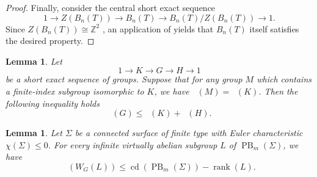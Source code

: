 \documentclass[a4paper,12pt,leqno]{amsart}
\newtheorem{lemma}[theorem]{Lemma}
\theoremstyle{definition}
\newcommand{\calF}{{\mathcal F}}
\DeclareMathOperator{\cd}{cd}
\DeclareMathOperator{\gdfin}{gd_{\calF_0}}
\DeclareMathOperator{\pb}{PB}
\DeclareMathOperator{\rank}{rank}
\begin{document}
\begin{proof}
Finally, consider the central short exact sequence
\[
  1 \to Z(B_n(T)) \to B_n(T) \to B_n(T)/Z(B_n(T)) \to 1.
\]
Since $Z(B_n(T)) \cong \mathbb{Z}^2$ \cite[Proposition 4.2]{Paris:Rolfsen}, an application of \cite[Proposition 4.15]{Rita:Porfirio:Luis}
yields that $B_n(T)$ itself satisfies the desired property.

\end{proof}




\begin{lemma}\label{exten:gd:inequality}\cite[Theorem 5.16]{Lu05}
Let 
\[
1 \to K \to G \to H \to 1
\]
be a short exact sequence of groups. Suppose that for any group \( M \) which contains a finite-index subgroup isomorphic to \( K \), we have \( \gdfin(M) = \gdfin(K) \). Then the following inequality holds
\[
\gdfin(G) \leq \gdfin(K) + \gdfin(H).
\]
\end{lemma}


\begin{lemma}\label{upper:bound:weil}
Let \( \Sigma \) be a connected surface of finite type with Euler characteristic \( \chi(\Sigma) \leq 0 \). For every infinite virtually abelian subgroup \( L \) of \( \pb_{m}(\Sigma) \), we have 
\[
\gdfin(W_G(L)) \leq \cd(\pb_{m}(\Sigma)) - \rank(L).
\]
\end{lemma}
\end{document}
